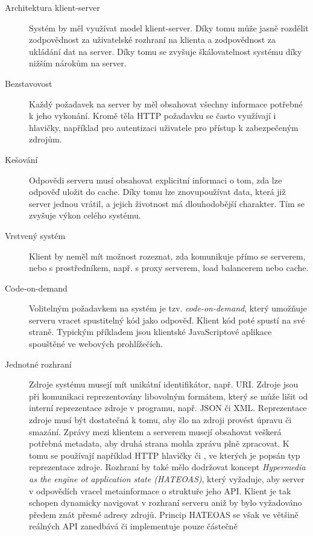 \begin{description}
    \item [Architektura klient-server] Systém by měl využívat model klient-server. Díky tomu může jasně rozdělit
    zodpovědnost za uživatelské rozhraní na klienta a zodpovědnost za ukládání dat na server. Díky tomu se zvyšuje
    škálovatelnost systému díky nižším nárokům na server.
    \item [Bezstavovost] Každý požadavek na server by měl obsahovat všechny informace potřebné k jeho vykonání.
    Kromě těla \gls{HTTP} požadavku se často využívají i hlavičky, například pro autentizaci uživatele pro
    přístup k zabezpečeným zdrojům.
    \item [Kešování] Odpovědi serveru musí obsahovat explicitní informaci o tom, zda lze odpověď uložit do cache.
    Díky tomu lze znovupoužívat data, která již server jednou vrátil, a jejich životnost má dlouhodobější charakter.
    Tím se zvyšuje výkon celého systému.
    \item [Vrstvený systém] Klient by neměl mít možnost rozeznat, zda komunikuje přímo se serverem, nebo s prostředníkem,
    např. s proxy serverem, load balancerem nebo cache.
    \item [Code-on-demand] Volitelným požadavkem na systém je tzv. \textit{code-on-demand}, který umožňuje serveru vracet
    spustitelný kód jako odpověď. Klient kód poté spustí na své straně. Typickým příkladem jsou klientské JavaScriptové aplikace spouštěné ve webových prohlížečích.
    \item [Jednotné rozhraní] Zdroje systému musejí mít unikátní identifikátor, např. \gls{URI}. Zdroje jsou při komunikaci reprezentovány libovolným formátem, který
    se může lišit od interní reprezentace zdroje v programu, např. \gls{JSON} či \gls{XML}. Reprezentace zdroje musí být
    dostatečná k tomu, aby šlo na zdroji provést úpravu či smazání. Zprávy mezi klientem a serverem musejí obsahovat veškerá potřebná metadata,
    aby druhá strana mohla zprávu plně zpracovat. K tomu se používají například \gls{HTTP} hlavičky 
    či , ve kterých je popsán typ reprezentace zdroje.
    Rozhraní by také mělo dodržovat koncept \textit{Hypermedia as the engine ot application state (\gls{HATEOAS})},
    který vyžaduje, aby server v odpovědích vracel metainformace o struktuře jeho \gls{API}.
    Klient je tak schopen dynamicky navigovat v rozhraní serveru aniž by bylo vyžadováno předem znát přesné adresy zdrojů.
    Princip \gls{HATEOAS} se však ve většině reálných \gls{API} zanedbává či implementuje pouze částečně
\end{description}

